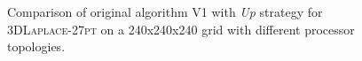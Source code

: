 \begin{figure}[t]
    \caption{Comparison of original algorithm V1 with \emph{Up} strategy for
    \textsc{3DLaplace-27pt} on a 240x240x240 grid with different processor topologies.}
    \label{fig.mtup}
\end{figure}


